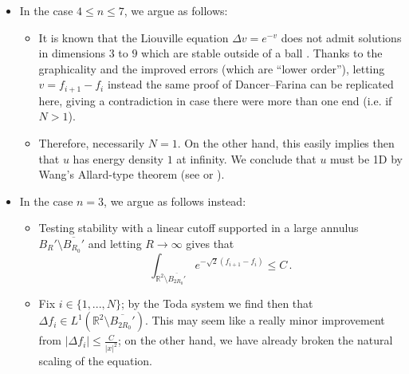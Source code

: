 \documentclass{article}
\newcommand{\R}{\mathbb{R}}
\theoremstyle{definition}
\begin{document}
\begin{itemize}
\item In the case $4\leq n\leq 7$, we argue as follows:
\begin{itemize}
    \item It is known that the Liouville equation $\Delta v = e^{-v}$
does not admit solutions in dimensions $3$ to $9$ which are stable outside of a ball \cite{DF09}. Thanks to the graphicality and the improved errors (which are ``lower order''), letting $v=f_{i+1}-f_i$ instead the same proof of Dancer--Farina can be replicated here, giving a contradiction in case there were more than one end (i.e. if $N>1$).
\item Therefore, necessarily $N=1$. On the other hand, this easily implies then that $u$ has energy density $1$ at infinity. We conclude that $u$ must be 1D by Wang's Allard-type theorem (see \cite{Wang17} or ).
\end{itemize} 
\item In the case $n=3$, we argue as follows instead:
\begin{itemize}
    \item Testing stability with a linear cutoff supported in a large annulus $B_R'\setminus \overline{B_{R_0}'}$ and letting $R\to\infty$ gives that
    \begin{equation}\label{eq:412fahpyh4y9uqby}
        \int_{\R^2\setminus \overline{B_{2R_0}'}} e^{-\sqrt{2}(f_{i+1}-f_i)}\leq C\,.
    \end{equation}
    \item Fix $i\in\{1,...,N\}$; by the Toda system we find then that $\Delta f_i\in L^1(\R^2\setminus \overline{B_{2R_0}'})$. This may seem like a really minor improvement from $|\Delta f_i|\leq\frac{C}{|x|^2}$; on the other hand, we have already broken the natural scaling of the equation.
    

\end{itemize}
\end{itemize}
\end{document}
